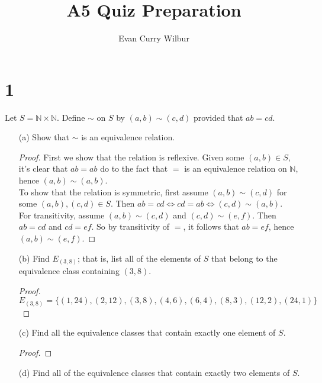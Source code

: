 \documentclass[]{article}
\title{A5 Quiz Preparation}
\author{Evan Curry Wilbur}
\begin{document}
\maketitle


\section*{1}
	Let $S = \mathbb{N} \times \mathbb{N}$. Define $\sim$ on $S$ by $(a, b) \sim (c, d)$ provided that $ab = cd$.
	\begin{itemize}
		\item[(a)] Show that $\sim$ is an equivalence relation.
			\begin{proof}
				First we show that the relation is reflexive. Given some $(a, b) \in S$, it's clear that $ab = ab$ do to the fact that $=$ is an equivalence relation on $\mathbb{N}$, hence $(a, b) \sim (a, b)$. \\
				To show that the relation is symmetric, first assume $(a, b) \sim (c, d)$ for some $(a, b), (c, d) \in S$. Then $ab = cd \iff cd = ab \iff (c, d) \sim (a, b)$. \\
				For transitivity, assume $(a, b) \sim (c, d)$ and $(c, d) \sim (e, f)$. Then $ab = cd$ and $cd = ef$. So by transitivity of $=$, it follows that $ab = ef$, hence $(a, b) \sim (e, f)$.
			\end{proof}
		\item[(b)] Find $E_{(3, 8)}$; that is, list all of the elements of $S$ that belong to the equivalence class containing $(3, 8)$.
			\begin{proof}
				$E_{(3, 8)} = \{(1, 24), (2, 12), (3, 8), (4, 6), (6, 4), (8, 3), (12,2), (24, 1)\}$
			\end{proof}
		\item[(c)] Find all the equivalence classes that contain exactly one element of $S$.
			\begin{proof}
				
			\end{proof}
		\item[(d)] Find all of the equivalence classes that contain exactly two elements of $S$.
	\end{itemize}
\end{document}
